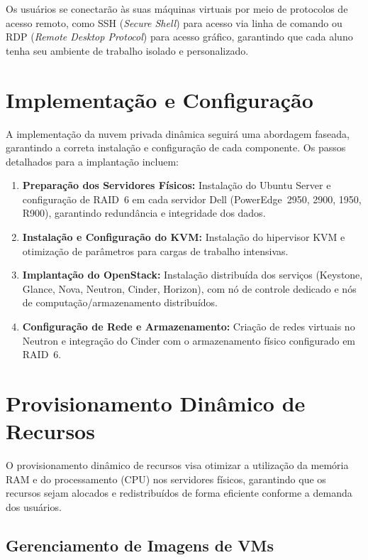 Os usuários se conectarão às suas máquinas virtuais por meio de protocolos de acesso remoto, como SSH (\textit{Secure Shell}) para acesso via linha de comando ou RDP (\textit{Remote Desktop Protocol}) para acesso gráfico, garantindo que cada aluno tenha seu ambiente de trabalho isolado e personalizado.

\section{Implementação e Configuração}

A implementação da nuvem privada dinâmica seguirá uma abordagem faseada, garantindo a correta instalação e configuração de cada componente. Os passos detalhados para a implantação incluem:

\begin{enumerate}
 \item \textbf{Preparação dos Servidores Físicos:} Instalação do Ubuntu Server e configuração de RAID~6 em cada servidor Dell (PowerEdge~2950, 2900, 1950, R900), garantindo redundância e integridade dos dados.
 \item \textbf{Instalação e Configuração do KVM:} Instalação do hipervisor KVM e otimização de parâmetros para cargas de trabalho intensivas.
 \item \textbf{Implantação do OpenStack:} Instalação distribuída dos serviços (Keystone, Glance, Nova, Neutron, Cinder, Horizon), com nó de controle dedicado e nós de computação/armazenamento distribuídos.
 \item \textbf{Configuração de Rede e Armazenamento:} Criação de redes virtuais no Neutron e integração do Cinder com o armazenamento físico configurado em RAID~6.
\end{enumerate}


\section{Provisionamento Dinâmico de Recursos}

O provisionamento dinâmico de recursos visa otimizar a utilização da memória RAM e do processamento (CPU) nos servidores físicos, garantindo que os recursos sejam alocados e redistribuídos de forma eficiente conforme a demanda dos usuários.

\subsection{Gerenciamento de Imagens de VMs}

